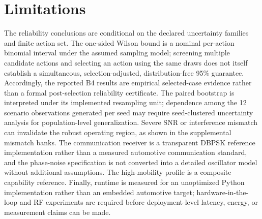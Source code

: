 \documentclass[journal]{IEEEtran}
\begin{document}
\section{Limitations}
\label{sec:limitations}
The reliability conclusions are conditional on the declared uncertainty families and finite action set. The one-sided Wilson bound is a nominal per-action binomial interval under the assumed sampling model; screening multiple candidate actions and selecting an action using the same draws does not itself establish a simultaneous, selection-adjusted, distribution-free 95\% guarantee. Accordingly, the reported B4 results are empirical selected-case evidence rather than a formal post-selection reliability certificate. The paired bootstrap is interpreted under its implemented resampling unit; dependence among the 12 scenario observations generated per seed may require seed-clustered uncertainty analysis for population-level generalization. Severe SNR or interference mismatch can invalidate the robust operating region, as shown in the supplemental mismatch banks. The communication receiver is a transparent DBPSK reference implementation rather than a measured automotive communication standard, and the phase-noise specification is not converted into a detailed oscillator model without additional assumptions. The high-mobility profile is a composite capability reference. Finally, runtime is measured for an unoptimized Python implementation rather than an embedded automotive target; hardware-in-the-loop and RF experiments are required before deployment-level latency, energy, or measurement claims can be made.





\end{document}

